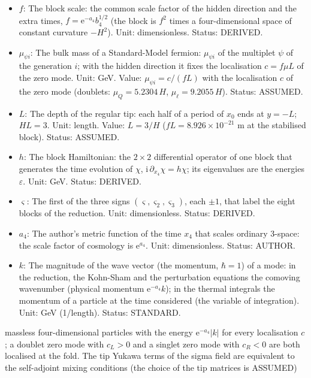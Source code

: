 \documentclass[
  10pt,
]{article}
\begin{document}
\begin{itemize}
  zero mode \(\Gamma_4 = -1\) (right-handed). Unit: dimensionless.
  Status: DERIVED.
\item
  \(f\): The block scale: the common scale factor of the hidden
  direction and the extra times, \(f = \mathrm{e}^{-a_4}b_4^{1/2}\) (the
  block is \(f^2\) times a four-dimensional space of constant curvature
  \(-H^2\)). Unit: dimensionless. Status: DERIVED.
\item
  \(\mu_{\psi i}\): The bulk mass of a Standard-Model fermion:
  \(\mu_{\psi i}\) of the multiplet \(\psi\) of the generation \(i\);
  with the hidden direction it fixes the localisation \(c = f\mu L\) of
  the zero mode. Unit: GeV. Value: \(\mu_{\psi i} = c/(fL)\) with the
  localisation \(c\) of the zero mode (doublets: \(\mu_Q = 5.2304\,H\),
  \(\mu_\ell = 9.2055\,H\)). Status: ASSUMED.
\item
  \(L\): The depth of the regular tip: each half of a period of \(x_0\)
  ends at \(y = -L\); \(HL = 3\). Unit: length. Value: \(L = 3/H\)
  (\(fL = 8.926\times10^{-21}\) m at the stabilised block). Status:
  ASSUMED.
\item
  \(h\): The block Hamiltonian: the \(2 \times 2\) differential operator
  of one block that generates the time evolution of \(\chi\),
  \(\mathrm{i}\,\partial_{x_4}\chi = h\chi\); its eigenvalues are the
  energies \(\varepsilon\). Unit: GeV. Status: DERIVED.
\item
  \(\varsigma\): The first of the three signs
  \((\varsigma, \varsigma_2, \varsigma_3)\), each \(\pm1\), that label
  the eight blocks of the reduction. Unit: dimensionless. Status:
  DERIVED.
\item
  \(a_4\): The author's metric function of the time \(x_4\) that scales
  ordinary 3-space: the scale factor of cosmology is
  \(\mathrm{e}^{a_4}\). Unit: dimensionless. Status: AUTHOR.
\item
  \(k\): The magnitude of the wave vector (the momentum, \(\hbar = 1\))
  of a mode: in the reduction, the Kohn-Sham and the perturbation
  equations the comoving wavenumber (physical momentum
  \(\mathrm{e}^{-a_4}k\)); in the thermal integrals the momentum of a
  particle at the time considered (the variable of integration). Unit:
  GeV (1/length). Status: STANDARD.
\end{itemize}

massless four-dimensional particles with the energy
\(\mathrm{e}^{-a_4}\lvert k\rvert\) for every localisation \(c\); a
doublet zero mode with \(c_L > 0\) and a singlet zero mode with
\(c_R < 0\) are both localised at the fold. The tip Yukawa terms of the
sigma field are equivalent to the self-adjoint mixing conditions (the
choice of the tip matrices is ASSUMED)
\end{document}
